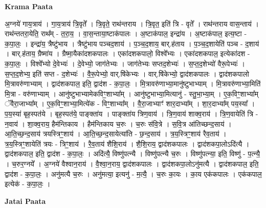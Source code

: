 \documentclass[17pt]{extarticle}
\begin{document}
\textbf{Krama Paata} \newline

अ॒ग्नये॑ गाय॒त्राय॑ । गा॒य॒त्राय॑ त्रि॒वृते᳚ । त्रि॒वृते॒ राथ॑न्तराय । त्रि॒वृत॒ इति॑ त्रि - वृते᳚ । राथ॑न्तराय वास॒न्ताय॑ । राथ॑न्ततरा॒येति॒ राथ᳚म् - त॒रा॒य॒ । वा॒स॒न्ताया॒ष्टाक॑पालः । अ॒ष्टाक॑पाल॒ इन्द्रा॑य । अ॒ष्टाक॑पाल॒ इत्य॒ष्टा - क॒पा॒लः॒ । इन्द्रा॑य॒ त्रैष्टु॑भाय । त्रैष्टु॑भाय पञ्चद॒शाय॑ । प॒ञ्च॒द॒शाय॒ बार्.ह॑ताय । प॒ञ्च॒द॒शायेति॑ पञ्च - द॒शाय॑ । बार्.ह॑ताय॒ ग्रैष्मा॑य । ग्रैष्मा॒यैका॑दशकपालः । एका॑दशकपालो॒ विश्वे᳚भ्यः । एका॑दशकपाल॒ इत्येका॑दश - क॒पा॒लः॒ । विश्वे᳚भ्यो दे॒वेभ्यः॑ । दे॒वेभ्यो॒ जाग॑तेभ्यः । जाग॑तेभ्यः सप्तद॒शेभ्यः॑ । स॒प्त॒द॒शेभ्यो॑ वैरू॒पेभ्यः॑ । स॒प्त॒द॒शेभ्य॒ इति॑ सप्त - द॒शेभ्यः॑ । वै॒रू॒पेभ्यो॒ वार्.षि॑केभ्यः । वार्.षि॑केभ्यो॒ द्वाद॑शकपालः । द्वाद॑शकपालो मि॒त्रावरु॑णाभ्याम् । द्वाद॑शकपाल॒ इति॒ द्वाद॑श - क॒पा॒लः॒ । मि॒त्रावरु॑णाभ्या॒मानु॑ष्टुभाभ्याम् । मि॒त्रावरु॑णाभ्या॒मिति॑ मि॒त्रा - वरु॑णाभ्याम् । आनु॑ष्टुभाभ्यामेकविꣳ॒॒शाभ्या᳚म् । आनु॑ष्टुभाभ्या॒मित्यानु॑ - स्तु॒भा॒भ्या॒म् । ए॒क॒विꣳ॒॒शाभ्या᳚म् ॅवैरा॒जाभ्या᳚म् । ए॒क॒विꣳ॒॒शाभ्या॒मित्ये॑क - विꣳ॒॒शाभ्या᳚म् । वै॒रा॒जाभ्याꣳ॑ शार॒दाभ्या᳚म् । शा॒र॒दाभ्या᳚म् पय॒स्या᳚ । प॒य॒स्या॑ बृह॒स्पत॑ये । बृह॒स्पत॑ये॒ पाङ्‍क्ता॑य । पाङ्‍क्ता॑य त्रिण॒वाय॑ । त्रि॒ण॒वाय॑ शाक्व॒राय॑ । त्रि॒ण॒वायेति॑ त्रि - न॒वाय॑ । शा॒क्व॒राय॒ हैम॑न्तिकाय । हैम॑न्तिकाय च॒रुः । च॒रुः स॑वि॒त्रे । स॒वि॒त्र आ॑तिच्छन्द॒साय॑ । आ॒ति॒च्छ॒न्द॒साय॑ त्रयस्त्रिꣳ॒॒शाय॑ । आ॒ति॒च्छ॒न्द॒सायेत्या॑ति - छ॒न्द॒साय॑ । त्र॒य॒स्त्रिꣳ॒॒शाय॑ रैव॒ताय॑ । त्र॒य॒स्त्रिꣳ॒॒शायेति॑ त्रयः - त्रिꣳ॒॒शाय॑ । रै॒व॒ताय॑ शैशि॒राय॑ । शै॒शि॒राय॒ द्वाद॑शकपालः । द्वाद॑शकपा॒लोऽदि॑त्यै । द्वाद॑शकपाल॒ इति॒ द्वाद॑श - क॒पा॒लः॒ । अदि॑त्यै॒ विष्णु॑पत्न्यै । विष्णु॑पत्न्यै च॒रुः । विष्णु॑पत्न्या॒ इति॒ विष्णु॑ - प॒त्न्यै॒ । च॒रुर॒ग्नये᳚ । अ॒ग्नये॑ वैश्वान॒राय॑ । वै॒श्वा॒न॒राय॒ द्वाद॑शकपालः । द्वाद॑शकपा॒लोऽनु॑मत्यै । द्वाद॑शकपाल॒ इति॒ द्वाद॑श - क॒पा॒लः॒ । अनु॑मत्यै च॒रुः । अनु॑मत्या॒ इत्यनु॑ - म॒त्यै॒ । च॒रुः का॒यः । का॒य एक॑कपालः । एक॑कपाल॒ इत्येक॑ - क॒पा॒लः॒ । \newline

\textbf{Jatai Paata} \newline
\end{document}
